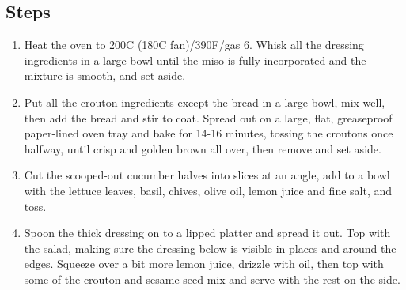 \documentclass{book}
\begin{document}
\subsection*{Steps}
\begin{enumerate}
\item Heat the oven to 200C (180C fan)/390F/gas 6. Whisk all the dressing ingredients in a large bowl until the miso is fully incorporated and the mixture is smooth, and set aside.
\item Put all the crouton ingredients except the bread in a large bowl, mix well, then add the bread and stir to coat. Spread out on a large, flat, greaseproof paper-lined oven tray and bake for 14-16 minutes, tossing the croutons once halfway, until crisp and golden brown all over, then remove and set aside.
\item Cut the scooped-out cucumber halves into slices at an angle, add to a bowl with the lettuce leaves, basil, chives, olive oil, lemon juice and fine salt, and toss.
\item Spoon the thick dressing on to a lipped platter and spread it out. Top with the salad, making sure the dressing below is visible in places and around the edges. Squeeze over a bit more lemon juice, drizzle with oil, then top with some of the crouton and sesame seed mix and serve with the rest on the side.
\end{enumerate}
\newpage
\end{document}
